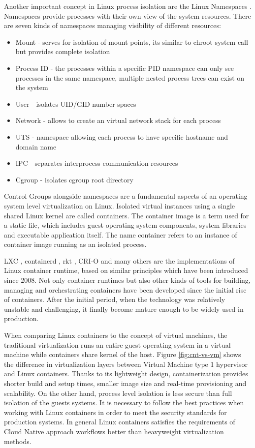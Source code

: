 \documentclass[
  digital, %
  twoside, %
  table,   %
  lof,     %
  lot,     %
]{fithesis3}
\begin{document}
Another important concept in Linux process isolation are the Linux Namespaces \cite{linux_namespaces}. Namespaces provide processes with their own view of the system resources. There are seven kinds of namespaces managing visibility of different resources:
\begin{itemize}
  \item Mount - serves for isolation of mount points, its similar to chroot system call but provides complete isolation
  \item Process ID - the processes within a specific PID namespace can only see processes in the same namespace, multiple nested process trees can exist on the system
  \item User - isolates UID/GID number spaces
  \item Network - allows to create an virtual network stack for each process
  \item UTS - namespace allowing each process to have specific hostname and domain name
  \item IPC - separates interprocess communication resources
  \item Cgroup - isolates cgroup root directory
\end{itemize}

Control Groups alongside namespaces are a fundamental aspects of an operating system level virtualization on Linux. Isolated virtual instances using a single shared Linux kernel are called containers. The container image is a term used for a static file, which includes guest operating system components, system libraries and executable application itself. The name container refers to an instance of container image running as an isolated process.

LXC \cite{lxc}, containerd \cite{containerd}, rkt \cite{rkt}, CRI-O \cite{cri-o} and many others are the implementations of Linux container runtime, based on similar principles which have been introduced since 2008. Not only container runtimes but also other kinds of tools for building, managing and orchestrating containers have been developed since the initial rise of containers. After the initial period, when the technology was relatively unstable and challenging, it finally become mature enough to be widely used in production.

When comparing Linux containers to the concept of virtual machines, the traditional virtualization runs an entire guest operating system in a virtual machine while containers share kernel of the host. Figure \ref{fig:cnt-vs-vm} shows the difference in virtualization layers between Virtual Machine type 1 hypervisor \cite{hypervisors} and Linux containers. Thanks to its lightweight design, containerization provides shorter build and setup times, smaller image size and real-time provisioning and scalability. On the other hand, process level isolation is less secure than full isolation of the guests systems. It is necessary to follow the best practices when working with Linux containers in order to meet the security standards for production systems. In general Linux containers satisfies the requirements of Cloud Native approach workflows better than heavyweight virtualization methods.
\end{document}
